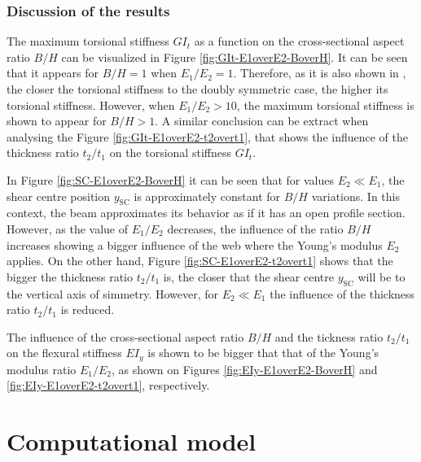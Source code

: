 \clearpage
\subsubsection{Discussion of the results} \label{subsubsec:disc_results_parametricStudy}

The maximum torsional stiffness $G I_t$ as a function on the cross-sectional aspect ratio $B/H$ can be visualized in Figure \ref{fig:GIt-E1overE2-BoverH}. It can be seen that it appears for $B/H = 1$ when $E_1/E_2 = 1$. Therefore, as it is also shown in \cite{Raither_basic}, the closer the torsional stiffness to the doubly symmetric case, the higher its torsional stiffness. However, when $E_1/E_2 > 10$, the maximum torsional stiffness is shown to appear for $B/H > 1$. A similar conclusion can be extract when analysing the Figure \ref{fig:GIt-E1overE2-t2overt1}, that shows the influence of the thickness ratio $t_2/t_1$ on the torsional stiffness $G I_t$.

In Figure \ref{fig:SC-E1overE2-BoverH} it can be seen that for values $E_2 \ll E_1$, the shear centre position $y_{\mathrm{SC}}$ is approximately constant for $B/H$ variations. In this context, the beam approximates its behavior as if it has an open profile section. However, as the value of $E_1/E_2$ decreases, the influence of the ratio $B/H$ increases showing a bigger influence of the web where the Young's modulus $E_2$ applies. On the other hand, Figure \ref{fig:SC-E1overE2-t2overt1} shows that the bigger the thickness ratio $t_2/t_1$ is, the closer that the shear centre $y_{\mathrm{SC}}$ will be to the vertical axis of simmetry. However, for $E_2 \ll E_1$ the influence of the thickness ratio $t_2/t_1$ is reduced.

The influence of the cross-sectional aspect ratio $B/H$ and the tickness ratio $t_2/t_1$ on the flexural stiffness $E I_y$ is shown to be bigger that that of the Young's modulus ratio $E_1/E_2$, as shown on Figures \ref{fig:EIy-E1overE2-BoverH} and \ref{fig:EIy-E1overE2-t2overt1}, respectively.




\section{Computational model} \label{sec:computationalModel}

% 